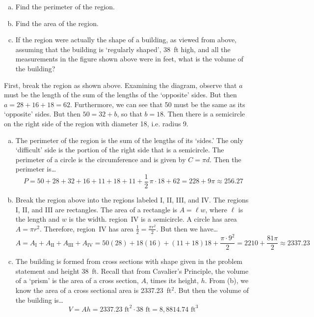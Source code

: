 \documentclass[11pt,letterpaper]{article}
\begin{document}
\begin{enumerate}[(a)]
\item Find the perimeter of the region. 
\item Find the area of the region. 
\item If the region were actually the shape of a building, as viewed from above, assuming that the building is `regularly shaped', 38~ft high, and all the measurements in the figure shown above were in feet, what is the volume of the building?
\end{enumerate} \pspace

\sol First, break the region as shown above. Examining the diagram, observe that $a$ must be the length of the sum of the lengths of the `opposite' sides. But then $a= 28 + 16 + 18= 62$. Furthermore, we can see that 50 must be the same as its `opposite' sides. But then $50= 32 + b$, so that $b= 18$. Then there is a semicircle on the right side of the region with diameter 18, i.e. radius 9. 


\begin{enumerate}[(a)]
\item The perimeter of the region is the sum of the lengths of its `sides.' The only `difficult' side is the portion of the right side that is a semicircle. The perimeter of a circle is the circumference and is given by $C= \pi d$. Then the perimeter is\dots
	\[
	P= 50 + 28 + 32 + 16 + 11 + 18 + 11 + \frac{1}{2}\, \pi \cdot 18 + 62= 228 + 9\pi \approx 256.27
	\]

\item Break the region above into the regions labeled I, II, III, and IV. The regions I, II, and III are rectangles. The area of a rectangle is $A= \ell w$, where $\ell$ is the length and $w$ is the width. region~IV is a semicircle. A circle has area $A= \pi r^2$. Therefore, region~IV has area $\frac{1}{2}= \frac{\pi r^2}{2}$. But then we have\dots
	\[
	A= A_{\text{I}} + A_{\text{II}} + A_{\text{III}} + A_{\text{IV}}= 50(28) + 18(16) + (11 + 18)18 + \frac{\pi \cdot 9^2}{2}= 2210 + \frac{81 \pi}{2} \approx 2337.23
	\]

\item The building is formed from cross sections with shape given in the problem statement and height 38~ft. Recall that from Cavalier's Principle, the volume of a `prism' is the area of a cross section, $A$, times its height, $h$. From (b), we know the area of a cross sectional area is 2337.23~ft$^2$. But then the volume of the building is\dots
	\[
	V= Ah= 2337.23 \text{ ft}^2 \cdot 38 \text{ ft}= 8,\!8814.74 \text{ ft}^3
	\]
\end{enumerate}
\end{document}

